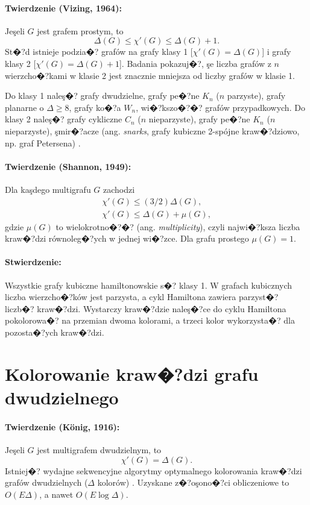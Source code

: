 \documentclass[12pt,a4paper]{mwrep}
\begin{document}
\paragraph{Twierdzenie (Vizing, 1964):} Jeşeli $G$ jest grafem prostym, to
\begin{equation}
\Delta(G) \le \chi'(G) \le \Delta(G) + 1.
\end{equation}
St�?d istnieje podzia�? grafów na grafy klasy 1 [$\chi'(G) = \Delta(G)$]
i grafy klasy 2 [$\chi'(G) = \Delta(G) + 1$].
Badania pokazuj�?, şe liczba grafów z $n$ wierzcho�?kami w klasie 2
jest znacznie mniejsza od liczby grafów w klasie 1.

Do klasy 1 naleş�? grafy dwudzielne, 
grafy pe�?ne $K_n$ ($n$ parzyste),
grafy planarne o $\Delta \ge 8$,
grafy ko�?a $W_n$,
wi�?kszo�?�? grafów przypadkowych.
Do klasy 2 naleş�? grafy cykliczne $C_n$ ($n$ nieparzyste),
grafy pe�?ne $K_n$ ($n$ nieparzyste),
şmir�?acze (ang. \emph{snarks}, grafy kubiczne 2-spójne kraw�?dziowo,
np. graf Petersena)
\cite{wiki_snark}.

\paragraph{Twierdzenie (Shannon, 1949):} Dla kaşdego multigrafu $G$
zachodzi 
\begin{gather}
\chi'(G) \le (3/2) \Delta(G), \\
\chi'(G) \le \Delta(G) + \mu(G), 
\end{gather}
gdzie $\mu(G)$ to wielokrotno�?�? (ang. \emph{multiplicity}), 
czyli najwi�?ksza liczba kraw�?dzi równoleg�?ych w jednej wi�?zce.
Dla grafu prostego $\mu(G)=1$.

\paragraph{Stwierdzenie:} Wszystkie grafy kubiczne hamiltonowskie
s�? klasy 1. W grafach kubicznych liczba wierzcho�?ków jest parzysta,
a cykl Hamiltona zawiera parzyst�? liczb�? kraw�?dzi.
Wystarczy kraw�?dzie naleş�?ce do cyklu Hamiltona pokolorowa�?
na przemian dwoma kolorami, a trzeci kolor wykorzysta�?
dla pozosta�?ych kraw�?dzi.

\section{Kolorowanie kraw�?dzi grafu dwudzielnego}
\label{sec:kolorowanie_krawedzi_dwudzielny}

\paragraph{Twierdzenie (K\"{o}nig, 1916):} Jeşeli $G$ jest 
multigrafem dwudzielnym, to
\begin{equation}
\chi'(G) = \Delta(G).
\end{equation}
Istniej�? wydajne sekwencyjne algorytmy optymalnego kolorowania
kraw�?dzi grafów dwudzielnych ($\Delta$ kolorów)
\cite{1982_Cole_Hopcroft}.
Uzyskane z�?oşono�?ci obliczeniowe to $O(E \Delta)$, a nawet
$O(E \log \Delta)$.
\end{document}
